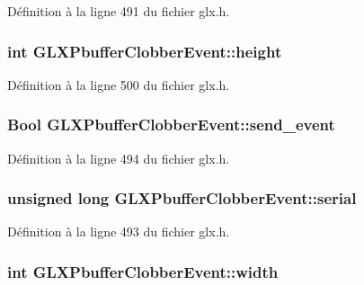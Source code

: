 Définition à la ligne 491 du fichier glx.\-h.

\hypertarget{struct_g_l_x_pbuffer_clobber_event_aed4e539c896bdad15217bf92c28f8520}{
\subsubsection[{height}]{\setlength{\rightskip}{0pt plus 5cm}int G\-L\-X\-Pbuffer\-Clobber\-Event\-::height}}\label{struct_g_l_x_pbuffer_clobber_event_aed4e539c896bdad15217bf92c28f8520}


Définition à la ligne 500 du fichier glx.\-h.

\hypertarget{struct_g_l_x_pbuffer_clobber_event_aa51969e67e4ad6095bda26ca64fe8ba6}{
\subsubsection[{send\-\_\-event}]{\setlength{\rightskip}{0pt plus 5cm}Bool G\-L\-X\-Pbuffer\-Clobber\-Event\-::send\-\_\-event}}\label{struct_g_l_x_pbuffer_clobber_event_aa51969e67e4ad6095bda26ca64fe8ba6}


Définition à la ligne 494 du fichier glx.\-h.

\hypertarget{struct_g_l_x_pbuffer_clobber_event_a6390b2875ae06a4cb827d2b4c321eda3}{
\subsubsection[{serial}]{\setlength{\rightskip}{0pt plus 5cm}unsigned long G\-L\-X\-Pbuffer\-Clobber\-Event\-::serial}}\label{struct_g_l_x_pbuffer_clobber_event_a6390b2875ae06a4cb827d2b4c321eda3}


Définition à la ligne 493 du fichier glx.\-h.

\hypertarget{struct_g_l_x_pbuffer_clobber_event_aaca375fecb872c73c60cd5d0bfc7c7a5}{
\subsubsection[{width}]{\setlength{\rightskip}{0pt plus 5cm}int G\-L\-X\-Pbuffer\-Clobber\-Event\-::width}}\label{struct_g_l_x_pbuffer_clobber_event_aaca375fecb872c73c60cd5d0bfc7c7a5}


